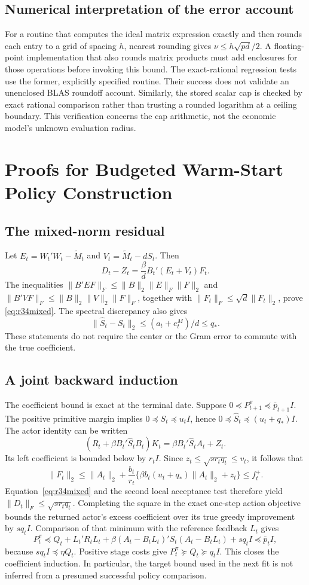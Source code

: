 \documentclass[ecta,nameyear,draft]{econsocart}
\theoremstyle{definition}
\theoremstyle{remark}
\begin{document}
\subsection{Numerical interpretation of the error account}
For a routine that computes the ideal matrix expression exactly and then
rounds each entry to a grid of spacing $h$, nearest rounding gives
$\nu\leq h\sqrt{pd}/2$. A floating-point implementation that also rounds
matrix products must add enclosures for those operations before invoking
this bound. The exact-rational regression tests use the former, explicitly
specified routine. Their success does not validate an unenclosed BLAS
roundoff account. Similarly, the stored scalar cap is checked by exact
rational comparison rather than trusting a rounded logarithm at a ceiling
boundary. This verification concerns the cap arithmetic, not the economic
model's unknown evaluation radius.

\section{Proofs for Budgeted Warm-Start Policy Construction}
\label{sec:r34proof}
\subsection{The mixed-norm residual}
Let $E_t=W_t'W_t-\widetilde M_t$ and
$V_t=\widetilde M_t-dS_t$. Then
\[
 D_t-Z_t=\frac{\beta}{d}B_t'(E_t+V_t)F_t.
\]
The inequalities $\|B'EF\|_F\leq\|B\|_2\|E\|_F\|F\|_2$ and
$\|B'VF\|_F\leq\|B\|_2\|V\|_2\|F\|_F$, together with
$\|F_t\|_F\leq\sqrt d\|F_t\|_2$, prove \eqref{eq:r34mixed}.
The spectral discrepancy also gives
\[
 \|\widehat S_t-S_t\|_2\leq(a_t+e_t^M)/d\leq q_*.
\]
These statements do not require the center or the Gram error to commute
with the true coefficient.

\subsection{A joint backward induction}
The coefficient bound is exact at the terminal date. Suppose
$0\preceq P_{t+1}^\pi\preceq\bar p_{t+1}I$. The positive primitive margin
implies $0\preceq S_t\preceq u_tI$, hence
$0\preceq\widehat S_t\preceq(u_t+q_*)I$. The actor identity can be written
\[
 (R_t+\beta B_t'\widehat S_tB_t)K_t
                      =\beta B_t'\widehat S_tA_t+Z_t.
\]
Its left coefficient is bounded below by $r_tI$. Since
$z_t\leq\sqrt{s r_tq_t}\leq v_t$, it follows that
\[
 \|F_t\|_2\leq\|A_t\|_2+
    \frac{b_t}{r_t}\{\beta b_t(u_t+q_*)\|A_t\|_2+z_t\}
       \leq f_t^+.
\]
Equation~\eqref{eq:r34mixed} and the second local acceptance test therefore
yield $\|D_t\|_F\leq\sqrt{s r_tq_t}$. Completing the square in the exact
one-step action objective bounds the returned actor's excess coefficient
over its true greedy improvement by $s q_t I$. Comparison of that minimum
with the reference feedback $L_t$ gives
\[
 P_t^\pi\preceq Q_t+L_t'R_tL_t+
 \beta(A_t-B_tL_t)'S_t(A_t-B_tL_t)+s q_tI\preceq\bar p_tI,
\]
because $s q_tI\preceq\eta Q_t$. Positive stage costs give
$P_t^\pi\succeq Q_t\succeq q_tI$. This closes the coefficient induction.
In particular, the target bound used in the next fit is not inferred from
a presumed successful policy comparison.
\end{document}
